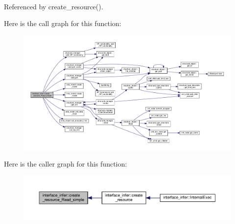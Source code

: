 Referenced by create\+\_\+resource().

Here is the call graph for this function\+:
\nopagebreak
\begin{figure}[H]
\begin{center}
\leavevmode
\includegraphics[width=350pt]{d9/d8a/classinterface__infer_a1b660bd8340d00695b5b8163edabe9f2_cgraph}
\end{center}
\end{figure}
Here is the caller graph for this function\+:
\nopagebreak
\begin{figure}[H]
\begin{center}
\leavevmode
\includegraphics[width=350pt]{d9/d8a/classinterface__infer_a1b660bd8340d00695b5b8163edabe9f2_icgraph}
\end{center}
\end{figure}
\mbox{\label{classinterface__infer_a939d3b1a8c42718def0faaad4e09624f}} 
